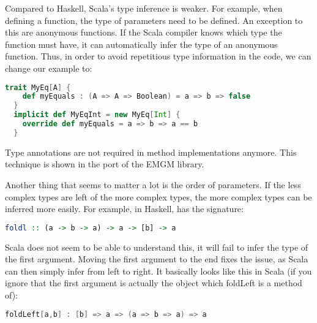 Compared to Haskell, Scala's type inference is weaker. For example, when
defining a function, the type of parameters need to be defined. An exception
to this are anonymous functions. If the Scala compiler knows which type the
function must have, it can automatically infer the type of an anonymous
function. Thus, in order to avoid repetitious type information in the code,
we can change our  example to:
\begin{lstlisting}[language=Scala,gobble=2]
  trait MyEq[A] {
    def myEquals : (A => A => Boolean) = a => b => false
  }
  implicit def MyEqInt = new MyEq[Int] {
    override def myEquals = a => b => a == b
  }
\end{lstlisting}
Type annotations are not required in method implementations anymore. This
technique is shown in the port of the EMGM library.

Another thing that seems to matter a lot is the order of parameters. If
the less complex types are left of the more complex types, the more
complex types can be inferred more easily. For example, in Haskell,
 has the signature:
\begin{lstlisting}[language=Haskell,gobble=2]
  foldl :: (a -> b -> a) -> a -> [b] -> a
\end{lstlisting}
Scala does not seem to be able to understand this, it will fail to
infer the type of the first argument. Moving the first argument to
the end fixes the issue, as Scala can then simply infer from left
to right. It basically looks like this in Scala (if you ignore that
the first argument is actually the object which foldLeft is a method
of):
\begin{lstlisting}[language=Scala,gobble=2]
  foldLeft[a,b] : [b] => a => (a => b => a) => a
\end{lstlisting}
